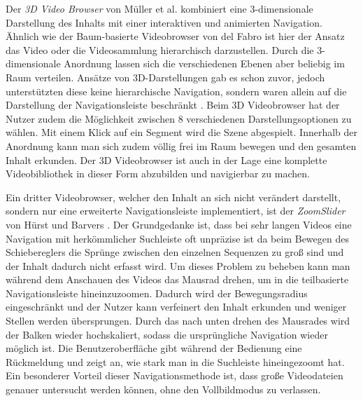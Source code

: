 \documentclass[11pt,a4paper]{report}
\begin{document}
Der \emph{3D Video Browser} von Müller et al. \cite{muller2012demonstration} kombiniert eine 3-dimensionale Darstellung des Inhalts mit einer interaktiven und animierten Navigation. Ähnlich wie der Baum-basierte Videobrowser von del Fabro \cite{del2010instant} ist hier der Ansatz das Video oder die Videosammlung hierarchisch darzustellen. Durch die 3-dimensionale Anordnung lassen sich die verschiedenen Ebenen aber beliebig im Raum verteilen. Ansätze von 3D-Darstellungen gab es schon zuvor, jedoch unterstützten diese keine hierarchische Navigation, sondern waren allein auf die Darstellung der Navigationsleiste beschränkt \cite{divakaran2005augmenting}. Beim 3D Videobrowser hat der Nutzer zudem die Möglichkeit zwischen 8 verschiedenen Darstellungsoptionen zu wählen. Mit einem Klick auf ein Segment wird die Szene abgespielt. Innerhalb der Anordnung kann man sich zudem völlig frei im Raum bewegen und den gesamten Inhalt erkunden. Der 3D Videobrowser ist auch in der Lage eine komplette Videobibliothek in dieser Form abzubilden und navigierbar zu machen. \cite{muller2012demonstration}

Ein dritter Videobrowser, welcher den Inhalt an sich nicht verändert darstellt, sondern nur eine erweiterte Navigationsleiste implementiert, ist der \emph{ZoomSlider} von Hürst und Barvers \cite{hurst2005interactive}. Der Grundgedanke ist, dass bei sehr langen Videos eine Navigation mit herkömmlicher Suchleiste oft unpräzise ist da beim Bewegen des Schiebereglers die Sprünge zwischen den einzelnen Sequenzen zu groß sind und der Inhalt dadurch nicht erfasst wird. Um dieses Problem zu beheben kann man während dem Anschauen des Videos das Mausrad drehen, um in die teilbasierte Navigationsleiste hineinzuzoomen. Dadurch wird der Bewegungsradius eingeschränkt und der Nutzer kann verfeinert den Inhalt erkunden und weniger Stellen werden übersprungen. Durch das nach unten drehen des Mausrades wird der Balken wieder hochskaliert, sodass die ursprüngliche Navigation wieder möglich ist. Die Benutzeroberfläche gibt während der Bedienung eine Rückmeldung und zeigt an, wie stark man in die Suchleiste hineingezoomt hat. Ein besonderer Vorteil dieser Navigationsmethode ist, dass große Videodateien genauer untersucht werden können, ohne den Vollbildmodus zu verlassen.
\end{document}
